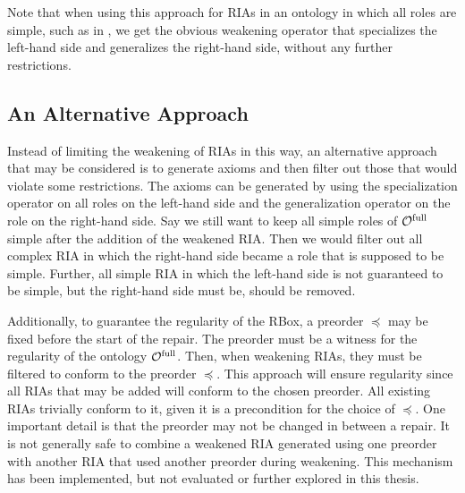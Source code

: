 Note that when using this approach for RIAs in an ontology in which all roles are simple, such as in \ALCH, we get the obvious weakening operator that specializes the left-hand side and generalizes the right-hand side, without any further restrictions.

\subsection{An Alternative Approach}\label{rbox-alternative}

Instead of limiting the weakening of RIAs in this way, an alternative approach that may be considered is to generate axioms and then filter out those that would violate some restrictions. The axioms can be generated by using the specialization operator on all roles on the left-hand side and the generalization operator on the role on the right-hand side. Say we still want to keep all simple roles of ${\mathcal{O}^\textnormal{full}}$ simple after the addition of the weakened RIA. Then we would filter out all complex RIA in which the right-hand side became a role that is supposed to be simple. Further, all simple RIA in which the left-hand side is not guaranteed to be simple, but the right-hand side must be, should be removed.

Additionally, to guarantee the regularity of the RBox, a preorder $\preceq$ may be fixed before the start of the repair. The preorder must be a witness for the regularity of the ontology ${\mathcal{O}^\textnormal{full}}$. Then, when weakening RIAs, they must be filtered to conform to the preorder $\preceq$. This approach will ensure regularity since all RIAs that may be added will conform to the chosen preorder. All existing RIAs trivially conform to it, given it is a precondition for the choice of $\preceq$. One important detail is that the preorder may not be changed in between a repair. It is not generally safe to combine a weakened RIA generated using one preorder with another RIA that used another preorder during weakening. This mechanism has been implemented, but not evaluated or further explored in this thesis.
